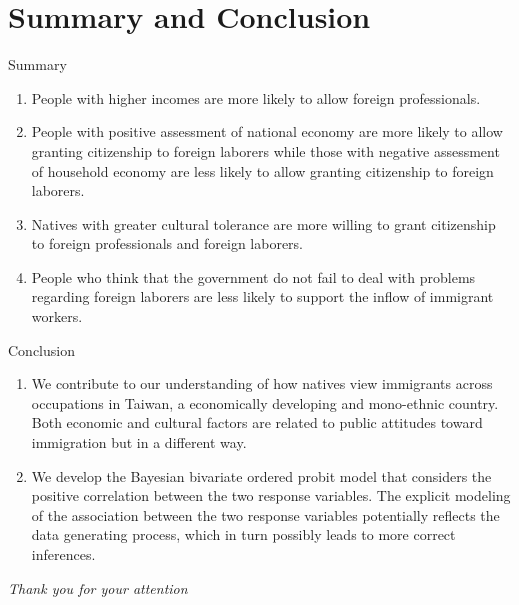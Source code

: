 \documentclass[12pt]{beamer}
\begin{document}
\section{Summary and Conclusion}
\begin{frame}{Summary}
\begin{enumerate}
\item People with higher incomes are more likely to allow foreign professionals. 
\item People with positive assessment of national economy are more likely to allow granting citizenship to foreign laborers while those with negative assessment of household economy are less likely to allow granting citizenship to foreign laborers. 
\item Natives with greater cultural tolerance are more willing to grant citizenship to foreign professionals and foreign laborers. 
\item People who think that the government do not fail to deal with problems regarding foreign laborers are less likely to support the inflow of immigrant workers.
\end{enumerate}
\end{frame}
\begin{frame}{Conclusion}
\begin{enumerate}
\item We contribute to our understanding of how natives view immigrants across occupations in Taiwan, a economically developing and mono-ethnic country. Both economic and cultural factors are related to public attitudes toward immigration but in a different way. 
\item  We develop  the Bayesian bivariate ordered probit model that considers the positive correlation between the two response variables. The explicit modeling of the association between the two response variables potentially reflects the data generating process, which in turn possibly leads to more correct inferences.
\end{enumerate}
\end{frame}
\begin{frame}
\begin{center}
\Huge
\textit{Thank you for your attention}
\end{center}
\end{frame}
\end{document}
